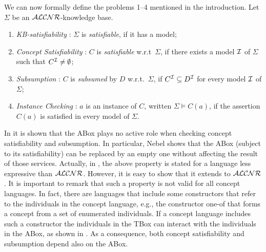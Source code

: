 We can now formally define the problems 1--4 mentioned in the
introduction. Let $\Sigma$ be an ${\cal ALCNR}$-knowledge base.
\begin{enumerate}
    
    \item {\em KB-satisfiability} : $\Sigma$ is {\em satisfiable},
	if it has a model;
  
    \item {\em Concept Satisfiability} : $C$ is {\em
	satisfiable} w.r.t\ $\Sigma$,	if there exists a model
	${\cal I}$ of $\Sigma$ such that $C^{\cal I} \neq \emptyset$;

    \item {\em Subsumption} : $C$ is {\em subsumed} by $D$
	w.r.t.\ $\Sigma$, 
	if $C^{\cal I}  \subseteq D^{\cal I}$ for every model ${\cal I}$ of $\Sigma$; 
  	
    \item {\em Instance Checking} : $a$ is an instance of $C$,
	written $\Sigma \models C(a)$, if the assertion $C(a)$  
	is satisfied in every model of $\Sigma$.

\end{enumerate}

In \cite[Sec.3.3.2]{Nebe90b} it is shown that the ABox plays no active role
when checking concept satisfiability and subsumption.  In particular, Nebel
shows that the ABox (subject to its satisfiability) can be replaced by an empty
one without affecting the result of those services.  Actually, in
\cite{Nebe90b}, the above property is stated for a language less expressive
than ${\cal ALCNR}$. However, it is easy to show that it extends to ${\cal ALCNR}$. It is
important to remark that such a property is not valid for all concept
languages. In fact, there are languages that include some constructors that
refer to the individuals in the concept language, e.g., the constructor {\sc
one-of} \cite{BBMR89} that forms a concept from a set of enumerated
individuals.  If a concept language includes such a constructor the individuals
in the TBox can interact with the individuals in the ABox, as shown in
\cite{Scha93c}. As a consequence, both concept satisfiability and subsumption
depend also on the ABox.


